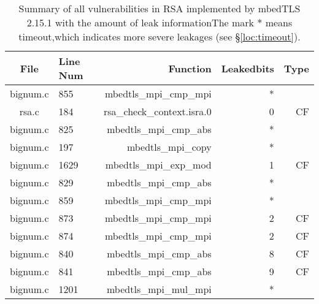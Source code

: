 \begin{table*}%
\centering
\caption{Summary of all vulnerabilities in RSA implemented by mbedTLS 2.15.1 with the amount of leak informationThe mark $*$ means timeout,which indicates more severe leakages (see \S\ref{loc:timeout}).}\label{tab:RSAmbedTLS}
\begin{tabular}{clrrr}
\hline
\textbf{File} & \textbf{Line Num} & \textbf{Function} & \textbf{Leakedbits} & \textbf{Type} \\\hline
bignum.c& 855&mbedtls\_mpi\_cmp\_mpi&*&\\
rsa.c& 184&rsa\_check\_context.isra.0&0 &CF\\
bignum.c& 825&mbedtls\_mpi\_cmp\_abs&*&\\
bignum.c& 197&mbedtls\_mpi\_copy&*&\\
bignum.c& 1629&mbedtls\_mpi\_exp\_mod&1 &CF\\
bignum.c& 829&mbedtls\_mpi\_cmp\_abs&*&\\
bignum.c& 859&mbedtls\_mpi\_cmp\_mpi&*&\\
bignum.c& 873&mbedtls\_mpi\_cmp\_mpi&2 &CF\\
bignum.c& 874&mbedtls\_mpi\_cmp\_mpi&2 &CF\\
bignum.c& 840&mbedtls\_mpi\_cmp\_abs&8 &CF\\
bignum.c& 841&mbedtls\_mpi\_cmp\_abs&9 &CF\\
bignum.c& 1201&mbedtls\_mpi\_mul\_mpi&*&\\
\hline
\end{tabular}
\end{table*}